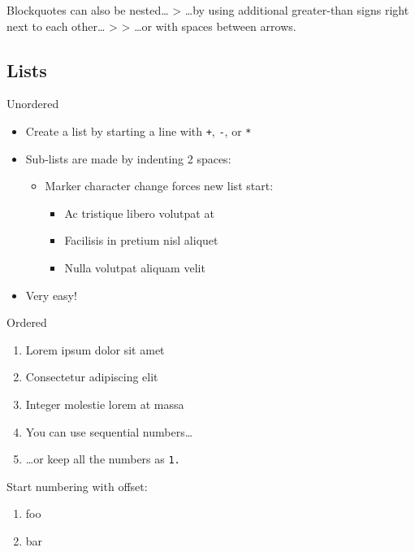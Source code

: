 \documentclass[
  paper=a4,
  ,captions=tableheading
]{scrartcl}
\newcommand{\passthrough}[1]{#1}
\providecommand{\tightlist}{%
  \setlength{\itemsep}{0pt}\setlength{\parskip}{0pt}}
\renewenvironment{quote}{\begin{customblockquote}\list{}{\rightmargin=0em\leftmargin=0em}%
\item\relax\color{blockquote-text}\ignorespaces}{\unskip\unskip\endlist\end{customblockquote}}
\begin{document}
\begin{quote}
Blockquotes can also be nested\ldots{} \textgreater{} \ldots by using
additional greater-than signs right next to each other\ldots{}
\textgreater{} \textgreater{} \ldots or with spaces between arrows.
\end{quote}

\hypertarget{lists}{%
\subsection{Lists}\label{lists}}

Unordered

\begin{itemize}
\tightlist
\item
  Create a list by starting a line with \passthrough{\lstinline!+!},
  \passthrough{\lstinline!-!}, or \passthrough{\lstinline!*!}
\item
  Sub-lists are made by indenting 2 spaces:

  \begin{itemize}
  \tightlist
  \item
    Marker character change forces new list start:

    \begin{itemize}
    \tightlist
    \item
      Ac tristique libero volutpat at
    \item
      Facilisis in pretium nisl aliquet
    \item
      Nulla volutpat aliquam velit
    \end{itemize}
  \end{itemize}
\item
  Very easy!
\end{itemize}

Ordered

\begin{enumerate}
\def\labelenumi{\arabic{enumi}.}
\item
  Lorem ipsum dolor sit amet
\item
  Consectetur adipiscing elit
\item
  Integer molestie lorem at massa
\item
  You can use sequential numbers\ldots{}
\item
  \ldots or keep all the numbers as \passthrough{\lstinline!1.!}
\end{enumerate}

Start numbering with offset:

\begin{enumerate}
\def\labelenumi{\arabic{enumi}.}
\setcounter{enumi}{56}
\tightlist
\item
  foo
\item
  bar
\end{enumerate}
\end{document}
